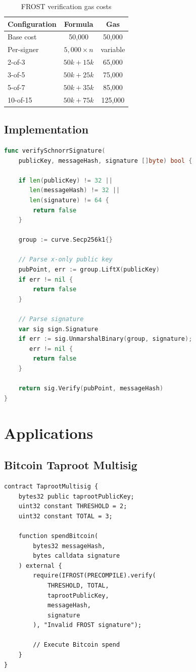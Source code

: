\documentclass[11pt,a4paper]{article}
\theoremstyle{definition}
\begin{document}
\begin{table}[h]
\centering
\begin{tabular}{lcc}
\toprule
Configuration & Formula & Gas \\
\midrule
Base cost & 50,000 & 50,000 \\
Per-signer & $5,000 \times n$ & variable \\
\midrule
2-of-3 & $50k + 15k$ & 65,000 \\
3-of-5 & $50k + 25k$ & 75,000 \\
5-of-7 & $50k + 35k$ & 85,000 \\
10-of-15 & $50k + 75k$ & 125,000 \\
\bottomrule
\end{tabular}
\caption{FROST verification gas costs}
\end{table}

\subsection{Implementation}

\begin{lstlisting}[language=Go]
func verifySchnorrSignature(
    publicKey, messageHash, signature []byte) bool {

    if len(publicKey) != 32 ||
       len(messageHash) != 32 ||
       len(signature) != 64 {
        return false
    }

    group := curve.Secp256k1{}

    // Parse x-only public key
    pubPoint, err := group.LiftX(publicKey)
    if err != nil {
        return false
    }

    // Parse signature
    var sig sign.Signature
    if err := sig.UnmarshalBinary(group, signature);
       err != nil {
        return false
    }

    return sig.Verify(pubPoint, messageHash)
}
\end{lstlisting}

\section{Applications}

\subsection{Bitcoin Taproot Multisig}

\begin{lstlisting}[language=Solidity]
contract TaprootMultisig {
    bytes32 public taprootPublicKey;
    uint32 constant THRESHOLD = 2;
    uint32 constant TOTAL = 3;

    function spendBitcoin(
        bytes32 messageHash,
        bytes calldata signature
    ) external {
        require(IFROST(PRECOMPILE).verify(
            THRESHOLD, TOTAL,
            taprootPublicKey,
            messageHash,
            signature
        ), "Invalid FROST signature");

        // Execute Bitcoin spend
    }
}
\end{lstlisting}
\end{document}
